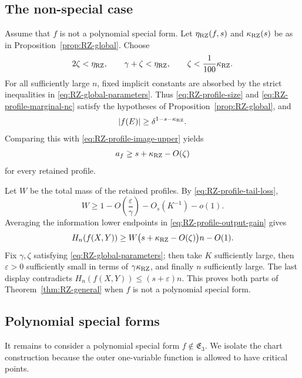 \documentclass[11pt]{article}
\begin{document}
\subsection{The non-special case}

Assume that \(f\) is not a polynomial special form.  Let
\(\eta_{\rm RZ}(f,s)\) and \(\kappa_{\rm RZ}(s)\) be as in
Proposition~\ref{prop:RZ-global}.  Choose
\begin{equation}
 2\zeta<\eta_{\rm RZ},\qquad
 \gamma+\zeta<\eta_{\rm RZ},\qquad
 \zeta<\frac{1}{100}\kappa_{\rm RZ}.
 \label{eq:RZ-global-parameters}
\end{equation}
For all sufficiently large \(n\), fixed implicit constants are
absorbed by the strict inequalities in
\eqref{eq:RZ-global-parameters}.  Thus
\eqref{eq:RZ-profile-size} and
\eqref{eq:RZ-profile-marginal-nc} satisfy the hypotheses of
Proposition~\ref{prop:RZ-global}, and
\[
 |f(E)|\ge\delta^{1-s-\kappa_{\rm RZ}}.
\]
Comparing this with \eqref{eq:RZ-profile-image-upper} yields
\begin{equation}
 a_f\ge s+\kappa_{\rm RZ}-O(\zeta)
 \label{eq:RZ-profile-output-gain}
\end{equation}
for every retained profile.

Let \(W\) be the total mass of the retained profiles.  By
\eqref{eq:RZ-profile-tail-loss},
\begin{equation}
 W\ge1-O\!\left(\frac{\varepsilon}{\gamma}\right)
       -O_s(K^{-1})-o(1).
 \label{eq:RZ-retained-mass-global}
\end{equation}
Averaging the information lower endpoints in
\eqref{eq:RZ-profile-output-gain} gives
\[
 H_n(f(X,Y))
 \ge W\bigl(s+\kappa_{\rm RZ}-O(\zeta)\bigr)n-O(1).
\]
Fix \(\gamma,\zeta\) satisfying
\eqref{eq:RZ-global-parameters}; then take \(K\) sufficiently large,
then \(\varepsilon>0\) sufficiently small in terms of
\(\gamma\kappa_{\rm RZ}\), and finally \(n\) sufficiently large.
The last display contradicts
\(H_n(f(X,Y))\le(s+\varepsilon)n\).  This proves both parts of
Theorem~\ref{thm:RZ-general} when \(f\) is not a polynomial special
form.

\subsection{Polynomial special forms}

It remains to consider a polynomial special form
\(f\notin\mathfrak E_3\).  We isolate the chart construction because
the outer one-variable function is allowed to have critical points.
\end{document}

